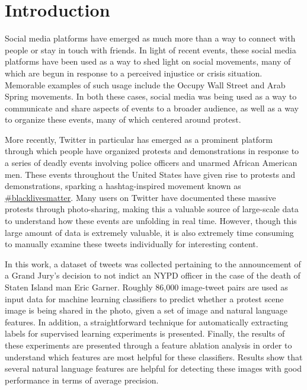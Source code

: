 \documentclass[twoside,11pt]{article}
\begin{document}
\section{Introduction}\label{sec:intro}
Social media platforms have emerged as much more than a way to connect with people or stay in touch with friends. In light of recent events, these social media platforms have been used as a way to shed light on social movements, many of which are begun in response to a perceived injustice or crisis situation. Memorable examples of such usage include the Occupy Wall Street and Arab Spring movements. In both these cases, social media was being used as a way to communicate and share aspects of events to a broader audience, as well as a way to organize these events, many of which centered around protest.
\par
More recently, Twitter in particular has emerged as a prominent platform through which people have organized protests and demonstrations in response to a series of deadly events involving police officers and unarmed African American men. These events throughout the United States have given rise to protests and demonstrations, sparking a hashtag-inspired movement known as \url{#blacklivesmatter}. Many users on Twitter have documented these massive protests through photo-sharing, making this a valuable source of large-scale data to understand how these events are unfolding in real time. However, though this large amount of data is extremely valuable, it is also extremely time consuming to manually examine these tweets individually for interesting content.
\par
In this work, a dataset of tweets was collected pertaining to the announcement of a Grand Jury's decision to not indict an NYPD officer in the case of the death of Staten Island man Eric Garner. Roughly 86,000 image-tweet pairs are used as input data for machine learning classifiers to predict whether a protest scene image is being shared in the photo, given a set of image and natural language features. In addition, a straightforward technique for automatically extracting labels for supervised learning experiments is presented. Finally, the results of these experiments are presented through a feature ablation analysis in order to understand which features are most helpful for these classifiers. Results show that several natural language features are helpful for detecting these images with good performance in terms of average precision.
\end{document}
